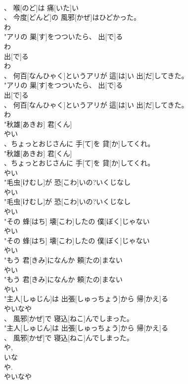\documentclass[8pt]{extreport}
\begin{document}
\begin{CJK}{UTF8}{min}
\\	、 喉[のど]は 痛[いた]い
\\	、 今度[どんど]の 風邪[かぜ]はひどかった。
\\	わ
\\	"アリの 巣[す]をつついたら、 出[で]る
\\	わ
\\	出[で]る
\\	わ
\\	、 何百[なんひゃく]というアリが 這[は]い 出[だ]してきた。
\\	"アリの 巣[す]をつついたら、 出[で]る
\\	出[で]る
\\	、 何百[なんひゃく]というアリが 這[は]い 出[だ]してきた。
\\	わ
\\	"秋雄[あきお] 君[くん]
\\	やい
\\	、ちょっとおじさんに 手[て]を 貸[か]してくれ。
\\	"秋雄[あきお] 君[くん]
\\	、ちょっとおじさんに 手[て]を 貸[か]してくれ。
\\	やい
\\	"毛虫[けむし]が 恐[こわ]いの?いくじなし
\\	やい
\\	"毛虫[けむし]が 恐[こわ]いの?いくじなし
\\	やい
\\	"その 蜂[はち] 壊[こわ]したの 僕[ぼく]じゃない
\\	やい
\\	"その 蜂[はち] 壊[こわ]したの 僕[ぼく]じゃない
\\	やい
\\	"もう 君[きみ]になんか 頼[たの]まない
\\	やい
\\	"もう 君[きみ]になんか 頼[たの]まない
\\	やい
\\	"主人[しゅじん]は 出張[しゅっちょう]から 帰[かえ]る
\\	やいなや
\\	、 風邪[かぜ]で 寝込[ねこ]んでしまった。
\\	"主人[しゅじん]は 出張[しゅっちょう]から 帰[かえ]る
\\	、 風邪[かぜ]で 寝込[ねこ]んでしまった。
\\	や, 
\\	いな 
\\	や.	
\\	やいなや

\end{CJK}
\end{document}
